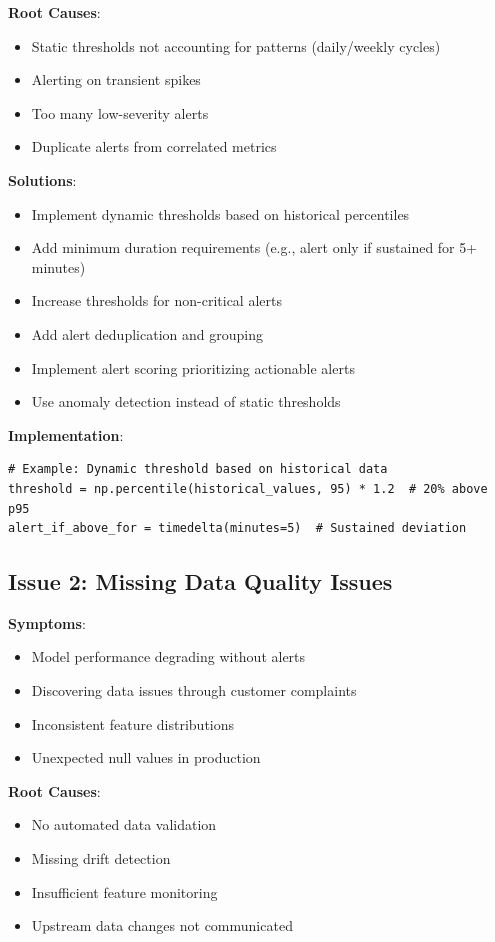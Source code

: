 \textbf{Root Causes}:
\begin{itemize}
    \item Static thresholds not accounting for patterns (daily/weekly cycles)
    \item Alerting on transient spikes
    \item Too many low-severity alerts
    \item Duplicate alerts from correlated metrics
\end{itemize}

\textbf{Solutions}:
\begin{itemize}
    \item Implement dynamic thresholds based on historical percentiles
    \item Add minimum duration requirements (e.g., alert only if sustained for 5+ minutes)
    \item Increase thresholds for non-critical alerts
    \item Add alert deduplication and grouping
    \item Implement alert scoring prioritizing actionable alerts
    \item Use anomaly detection instead of static thresholds
\end{itemize}

\textbf{Implementation}:
\begin{lstlisting}[style=python]
# Example: Dynamic threshold based on historical data
threshold = np.percentile(historical_values, 95) * 1.2  # 20% above p95
alert_if_above_for = timedelta(minutes=5)  # Sustained deviation
\end{lstlisting}

\subsection{Issue 2: Missing Data Quality Issues}

\textbf{Symptoms}:
\begin{itemize}
    \item Model performance degrading without alerts
    \item Discovering data issues through customer complaints
    \item Inconsistent feature distributions
    \item Unexpected null values in production
\end{itemize}

\textbf{Root Causes}:
\begin{itemize}
    \item No automated data validation
    \item Missing drift detection
    \item Insufficient feature monitoring
    \item Upstream data changes not communicated
\end{itemize}


